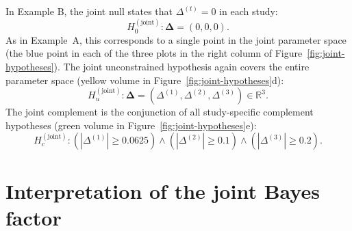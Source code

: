 \documentclass[letterpaper,11pt,oneside]{article}
\begin{document}
In Example B, the joint null states that $\Delta^{(t)}=0$ in each study:
    \[
    H_{0}^{(\text{joint})}: \boldsymbol{\Delta} = (0,0,0).
    \]
As in Example~A, this corresponds to a single point in the joint parameter space (the blue point in each of the three plots in the right column of Figure~\ref{fig:joint-hypotheses}). The joint unconstrained hypothesis again covers the entire parameter space (yellow volume in Figure~\ref{fig:joint-hypotheses}d):
    \[
    H_{u}^{(\text{joint})}: \boldsymbol{\Delta} =
    (\Delta^{(1)}, \Delta^{(2)}, \Delta^{(3)}) \in \mathbb{R}^3.
    \]
The joint complement is the conjunction of all study-specific complement hypotheses (green volume in Figure~\ref{fig:joint-hypotheses}e):
    \[
        H_{c}^{(\text{joint})}:
        \left(\left|\Delta^{(1)}\right| \geq 0.0625\right)
        \land
        \left(\left|\Delta^{(2)}\right| \geq 0.1\right)
        \land
        \left(\left|\Delta^{(3)}\right| \geq 0.2\right).
    \]




\section{Interpretation of the joint Bayes factor}

\label{sec:interpretation-joint-bf}
\end{document}
